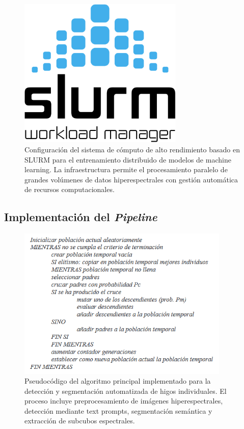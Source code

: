 \begin{figure}[!ht]
\centering
\includegraphics[width=0.7\textwidth]{images/slurm.png}
\caption{Configuración del sistema de cómputo de alto rendimiento basado en SLURM para el entrenamiento distribuido de modelos de machine learning. La infraestructura permite el procesamiento paralelo de grandes volúmenes de datos hiperespectrales con gestión automática de recursos computacionales.}
\label{fig:sistema_slurm}
\end{figure}



\subsection{Implementación del \emph{Pipeline}}

\begin{figure}[!ht]
\centering
\includegraphics[width=0.9\textwidth]{images/pseudocodigo.png}
\caption{Pseudocódigo del algoritmo principal implementado para la detección y segmentación automatizada de higos individuales. El proceso incluye preprocesamiento de imágenes hiperespectrales, detección mediante text prompts, segmentación semántica y extracción de subcubos espectrales.}
\label{fig:pseudocodigo_sistema}
\end{figure}


